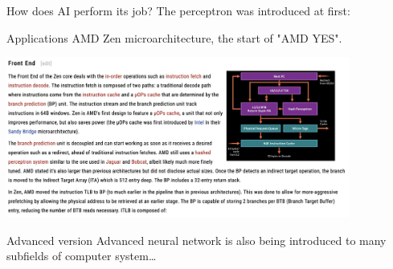 \documentclass[UTF8]{beamer}
\begin{document}
\begin{frame}{How does AI perform its job?}
  The perceptron was introduced at first:
  \begin{center} 
  \end{center}
\end{frame}

\begin{frame}{Applications}
  AMD Zen microarchitecture, the start of "AMD YES".
  \begin{center}
    \includegraphics[height=150pt]{figure/amd_zen_bp.jpg}
  \end{center}
\end{frame}

\begin{frame}{Advanced version}
  Advanced neural network is also being introduced to many subfields of computer system\dots
\end{frame}
\end{document}
